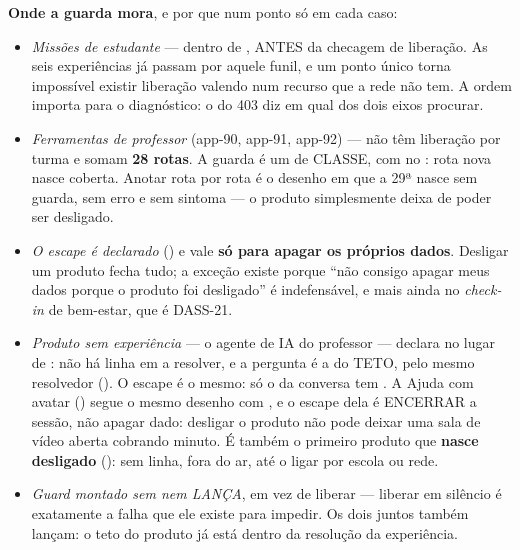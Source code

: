 \textbf{Onde a guarda mora}, e por que num ponto só em cada caso:

\begin{itemize}
  \item \emph{Missões de estudante} --- dentro de
    , ANTES da checagem de liberação. As seis
    experiências já passam por aquele funil, e um ponto único torna impossível
    existir liberação valendo num recurso que a rede não tem. A ordem importa
    para o diagnóstico: o  do 403 diz em qual dos dois eixos procurar.
  \item \emph{Ferramentas de professor} (app-90, app-91, app-92) --- não têm
    liberação por turma e somam \textbf{28 rotas}. A guarda é um
     de CLASSE, com  no
    : rota nova nasce coberta. Anotar rota por rota é o desenho
    em que a 29ª nasce sem guarda, sem erro e sem sintoma --- o produto
    simplesmente deixa de poder ser desligado.
  \item \emph{O escape é declarado} () e vale
    \textbf{só para apagar os próprios dados}. Desligar um produto fecha tudo; a
    exceção existe porque \enquote{não consigo apagar meus dados porque o produto
    foi desligado} é indefensável, e mais ainda no \emph{check-in} de bem-estar,
    que é DASS-21.
  \item \emph{Produto sem experiência} --- o agente de IA do professor ---
    declara  no lugar de : não há
    linha em  a resolver, e a pergunta é a do TETO, pelo mesmo
    resolvedor (). O escape é o mesmo: só o
     da conversa tem . A Ajuda com avatar
    () segue o mesmo desenho com , e o escape
    dela é ENCERRAR a sessão, não apagar dado: desligar o produto não pode deixar
    uma sala de vídeo aberta cobrando minuto. É também o primeiro produto que
    \textbf{nasce desligado} (): sem
    linha, fora do ar, até o  ligar por escola ou rede.
  \item \emph{Guard montado sem  nem  LANÇA}, em vez de
    liberar --- liberar em silêncio é exatamente a falha que ele existe para
    impedir. Os dois juntos também lançam: o teto do produto já está dentro da
    resolução da experiência.
\end{itemize}

